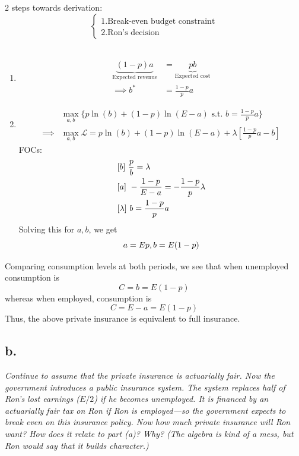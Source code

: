 \documentclass[
]{article}
\begin{document}
2 steps towards derivation:
\[\begin{cases} 1. \text{Break-even budget constraint} \\
 2. \text{Ron's decision} \end{cases}\]\\

\begin{enumerate} 
\item 
$$\begin{aligned} 
\underbrace{(1-p)a}_{\text{Expected revenue}} &= \underbrace{pb}_{\text{Expected cost}} \\
\implies b^ * &= \frac{1-p}{p}a
\end{aligned}$$ 

\item 
$$\begin{aligned}
&\max_{a, b} \{ p\ln (b) + (1-p) \ln (E-a) \text{ s.t. } b = \frac{1-p}{p}a \} \\
\implies & \max_{a, b} \mathcal{L} = p\ln (b) + (1-p) \ln (E-a) + \lambda [\frac{1-p}{p}a - b]
\end{aligned}$$  
FOCs: 
$$\begin{aligned}
&[b] \text{ }\space \frac{p}{b} = \lambda \\
&[a] \text{ }\space -\frac{1-p}{E-a} = -\frac{1-p}{p}\lambda \\
&[\lambda ] \text{ }\space b = \frac{1-p}{p}a
\end{aligned}$$
Solving this for $a, b$, we get 
$$a = Ep, \space b = E(1-p)$$
\end{enumerate}

Comparing consumption levels at both periods, we see that when
unemployed consumption is \[C = b = E(1-p)\] whereas when employed,
consumption is \[C = E - a = E(1-p)\] Thus, the above private insurance
is equivalent to full insurance.

\hypertarget{b.-2}{%
\subsection{b.}\label{b.-2}}

\textit{Continue to assume that the private insurance is actuarially fair. Now the government introduces a public insurance system. The system replaces half of Ron’s lost earnings ($E/2$) if he becomes unemployed. It is financed by an actuarially fair tax on Ron if Ron is employed—so the government expects to break even on this insurance policy. Now how much private insurance will Ron want? How does it relate to part (a)? Why? (The algebra is kind of a mess, but Ron would say that it builds character.)}
\end{document}
